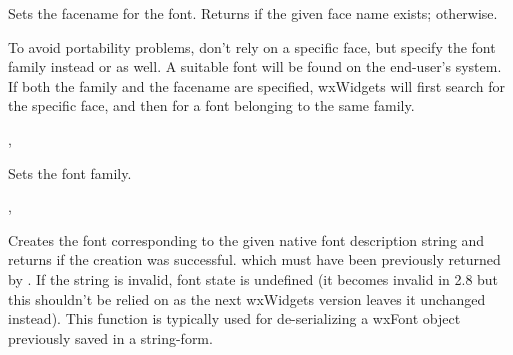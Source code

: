 
Sets the facename for the font.
Returns \true if the given face name exists; \false otherwise.




To avoid portability problems, don't rely on a specific face, but specify the font family
instead or as well. A suitable font will be found on the end-user's system. If both the
family and the facename are specified, wxWidgets will first search for the specific face,
and then for a font belonging to the same family.


, 


\label{wxfontsetfamily}


Sets the font family.




, 


\label{wxfontsetnativefontinfo}


Creates the font corresponding to the given native font description string and returns \true if
the creation was successful.
which must have been previously returned by
. If the string is
invalid, font state is undefined (it becomes invalid in 2.8 but this shouldn't
be relied on as the next wxWidgets version leaves it unchanged instead). This
function is typically used for de-serializing a wxFont object previously saved
in a string-form.

